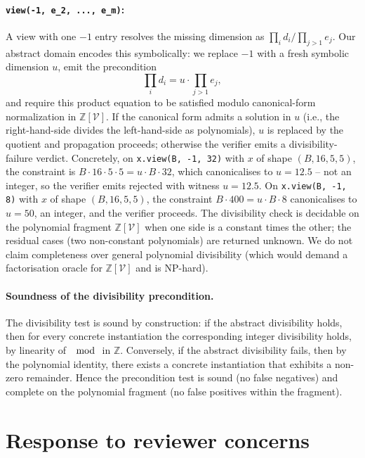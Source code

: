 \documentclass{article}
\theoremstyle{definition}
\begin{document}
\paragraph{\texttt{view(-1, e\_2, ..., e\_m)}:} A view with one
$-1$ entry resolves the missing dimension as $\prod_i d_i / \prod_{j>1} e_j$.
Our abstract domain encodes this symbolically: we replace $-1$
with a fresh symbolic dimension $u$, emit the precondition
\[
\prod_i d_i = u \cdot \prod_{j>1} e_j,
\]
and require this product equation to be satisfied modulo
canonical-form normalization in $\mathbb Z[\mathcal V]$. If the
canonical form admits a solution in $u$ (i.e., the right-hand-side
divides the left-hand-side as polynomials), $u$ is replaced by
the quotient and propagation proceeds; otherwise the verifier
emits a divisibility-failure verdict. Concretely, on
\verb|x.view(B, -1, 32)| with $x$ of shape $(B, 16, 5, 5)$, the
constraint is $B \cdot 16 \cdot 5 \cdot 5 = u \cdot B \cdot 32$,
which canonicalises to $u = 12.5$ -- not an integer, so the
verifier emits \textsf{rejected} with witness $u = 12.5$. On
\verb|x.view(B, -1, 8)| with $x$ of shape $(B, 16, 5, 5)$, the
constraint $B \cdot 400 = u \cdot B \cdot 8$ canonicalises to
$u = 50$, an integer, and the verifier proceeds. The
divisibility check is decidable on the polynomial fragment
$\mathbb Z[\mathcal V]$ when one side is a constant times the
other; the residual cases (two non-constant polynomials) are
returned \textsf{unknown}. We do not claim completeness over
general polynomial divisibility (which would demand a
factorisation oracle for $\mathbb Z[\mathcal V]$ and is
NP-hard).

\paragraph{Soundness of the divisibility precondition.} The
divisibility test is sound by construction: if the abstract
divisibility holds, then for every concrete instantiation the
corresponding integer divisibility holds, by linearity of $\mod$
in $\mathbb Z$. Conversely, if the abstract divisibility fails,
then by the polynomial identity, there exists a concrete
instantiation that exhibits a non-zero remainder. Hence the
precondition test is sound (no false negatives) and complete on
the polynomial fragment (no false positives within the fragment).

\section{Response to reviewer concerns}\label{app:response}
\end{document}
